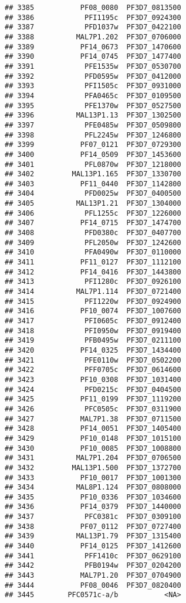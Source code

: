 \documentclass[12pt, a4paper]{article}\usepackage[]{graphicx}\usepackage[]{color}
\makeatletter
\newenvironment{kframe}{%
 \def\at@end@of@kframe{}%
 \ifinner\ifhmode%
  \def\at@end@of@kframe{\end{minipage}}%
  \begin{minipage}{\columnwidth}%
 \fi\fi%
 \def\FrameCommand##1{\hskip\@totalleftmargin \hskip-\fboxsep
 \colorbox{shadecolor}{##1}\hskip-\fboxsep
     \hskip-\linewidth \hskip-\@totalleftmargin \hskip\columnwidth}%
 \MakeFramed {\advance\hsize-\width
   \@totalleftmargin\z@ \linewidth\hsize
   \@setminipage}}%
 {\par\unskip\endMakeFramed%
 \at@end@of@kframe}
\newenvironment{knitrout}{}{} %
\makeatother
\begin{document}
\begin{knitrout}
\begin{kframe}
\begin{verbatim}
## 3385           PF08_0080  PF3D7_0813500
## 3386            PFI1195c  PF3D7_0924300
## 3387            PFD1037w  PF3D7_0422100
## 3388          MAL7P1.202  PF3D7_0706000
## 3389           PF14_0673  PF3D7_1470600
## 3390           PF14_0745  PF3D7_1477400
## 3391            PFE1535w  PF3D7_0530700
## 3392            PFD0595w  PF3D7_0412000
## 3393            PFI1505c  PF3D7_0931000
## 3394            PFA0465c  PF3D7_0109500
## 3395            PFE1370w  PF3D7_0527500
## 3396          MAL13P1.13  PF3D7_1302500
## 3397            PFE0485w  PF3D7_0509800
## 3398            PFL2245w  PF3D7_1246800
## 3399           PF07_0121  PF3D7_0729300
## 3400           PF14_0509  PF3D7_1453600
## 3401            PFL0870w  PF3D7_1218000
## 3402         MAL13P1.165  PF3D7_1330700
## 3403           PF11_0440  PF3D7_1142800
## 3404            PFD0025w  PF3D7_0400500
## 3405          MAL13P1.21  PF3D7_1304000
## 3406            PFL1255c  PF3D7_1226000
## 3407           PF14_0715  PF3D7_1474700
## 3408            PFD0380c  PF3D7_0407700
## 3409            PFL2050w  PF3D7_1242600
## 3410            PFA0490w  PF3D7_0110000
## 3411           PF11_0127  PF3D7_1112100
## 3412           PF14_0416  PF3D7_1443800
## 3413            PFI1280c  PF3D7_0926100
## 3414          MAL7P1.114  PF3D7_0721400
## 3415            PFI1220w  PF3D7_0924900
## 3416           PF10_0074  PF3D7_1007600
## 3417            PFI0605c  PF3D7_0912400
## 3418            PFI0950w  PF3D7_0919400
## 3419            PFB0495w  PF3D7_0211100
## 3420           PF14_0325  PF3D7_1434400
## 3421            PFE0110w  PF3D7_0502200
## 3422            PFF0705c  PF3D7_0614600
## 3423           PF10_0308  PF3D7_1031400
## 3424            PFD0215c  PF3D7_0404500
## 3425           PF11_0199  PF3D7_1119200
## 3426            PFC0505c  PF3D7_0311900
## 3427           MAL7P1.38  PF3D7_0711500
## 3428           PF14_0051  PF3D7_1405400
## 3429           PF10_0148  PF3D7_1015100
## 3430           PF10_0085  PF3D7_1008800
## 3431          MAL7P1.204  PF3D7_0706500
## 3432         MAL13P1.500  PF3D7_1372700
## 3433           PF10_0017  PF3D7_1001300
## 3434          MAL8P1.124  PF3D7_0808000
## 3435           PF10_0336  PF3D7_1034600
## 3436           PF14_0379  PF3D7_1440000
## 3437            PFC0381c  PF3D7_0309100
## 3438           PF07_0112  PF3D7_0727400
## 3439          MAL13P1.79  PF3D7_1315400
## 3440           PF14_0125  PF3D7_1412600
## 3441            PFF1410c  PF3D7_0629100
## 3442            PFB0194w  PF3D7_0204200
## 3443           MAL7P1.20  PF3D7_0704900
## 3444           PF08_0046  PF3D7_0820400
## 3445        PFC0571c-a/b           <NA>

\end{verbatim}
\end{kframe}
\end{knitrout}
\end{document}
